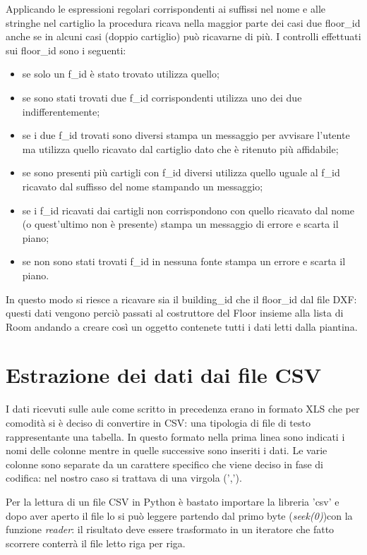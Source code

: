 \documentclass[12pt]{report}
\begin{document}
\vspace{5mm} %

Applicando le espressioni regolari corrispondenti ai suffissi nel nome e alle stringhe nel cartiglio la procedura ricava nella maggior parte dei casi due floor\_id anche se in alcuni casi (doppio cartiglio) può ricavarne di più. 
I controlli effettuati sui floor\_id sono i seguenti:
\begin{itemize}
\item se solo un f\_id è stato trovato utilizza quello;
\item se sono stati trovati due f\_id corrispondenti utilizza uno dei due indifferentemente;
\item se i due f\_id trovati sono diversi stampa un messaggio per avvisare l'utente ma utilizza quello ricavato dal cartiglio dato che è ritenuto più affidabile;
\item se sono presenti più cartigli con f\_id diversi utilizza quello uguale al f\_id ricavato dal suffisso del nome stampando un messaggio;
\item se i f\_id ricavati dai cartigli non corrispondono con quello ricavato dal nome (o quest'ultimo non  è presente) stampa un messaggio di errore e scarta il piano;
\item se non sono stati trovati f\_id in nessuna fonte stampa un errore e scarta il piano.  
\end{itemize}

In questo modo si riesce a ricavare sia il building\_id che il floor\_id dal file DXF: questi dati vengono perciò passati al costruttore del Floor insieme alla lista di Room andando a creare così un oggetto contenete tutti i dati letti dalla piantina.

\newpage
\section{Estrazione dei dati dai file CSV}

I dati ricevuti sulle aule come scritto in precedenza erano in formato XLS che per comodità si è deciso di convertire in CSV: una tipologia di file di testo rappresentante una tabella.
In questo formato nella prima linea sono indicati i nomi delle colonne mentre in quelle successive sono inseriti i dati. Le varie colonne sono separate da un carattere specifico che viene deciso in fase di codifica: nel nostro caso si trattava di una virgola (',').

Per la lettura di un file CSV in Python è bastato importare la libreria 'csv' e dopo aver aperto il file lo si può leggere partendo dal primo byte (\textit{seek(0)})con la funzione \textit{reader}: il risultato deve essere trasformato in un iteratore che fatto scorrere conterrà il file letto riga per riga.
\end{document}
